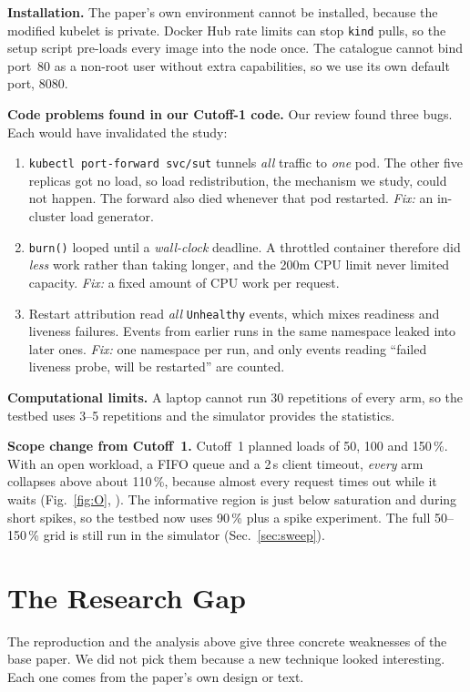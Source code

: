 \documentclass[conference]{IEEEtran}
\begin{document}
\textbf{Installation.} The paper's own environment cannot be installed,
because the modified kubelet is private. Docker Hub rate limits can stop
\texttt{kind} pulls, so the setup script pre-loads every image into the
node once. The catalogue cannot bind port~80 as a non-root user without
extra capabilities, so we use its own default port, 8080.

\textbf{Code problems found in our Cutoff-1 code.} Our review found
three bugs. Each would have invalidated the study:
\begin{enumerate}
\item \texttt{kubectl port-forward svc/sut} tunnels \emph{all} traffic
  to \emph{one} pod. The other five replicas got no load, so load
  redistribution, the mechanism we study, could not happen. The
  forward also died whenever that pod restarted. \emph{Fix:} an
  in-cluster load generator.
\item \texttt{burn()} looped until a \emph{wall-clock} deadline. A
  throttled container therefore did \emph{less} work rather than taking
  longer, and the 200m CPU limit never limited capacity. \emph{Fix:} a
  fixed amount of CPU work per request.
\item Restart attribution read \emph{all} \texttt{Unhealthy} events,
  which mixes readiness and liveness failures. Events from earlier runs
  in the same namespace leaked into later ones. \emph{Fix:} one
  namespace per run, and only events reading ``failed liveness probe,
  will be restarted'' are counted.
\end{enumerate}

\textbf{Computational limits.} A laptop cannot run 30 repetitions of
every arm, so the testbed uses 3--5 repetitions and the simulator
provides the statistics.

\textbf{Scope change from Cutoff~1.} Cutoff~1 planned loads of 50, 100
and 150\,\%. With an open workload, a FIFO queue and a 2\,s client
timeout, \emph{every} arm collapses above about 110\,\%, because almost
every request times out while it waits
(Fig.~\ref{fig:O}, \cite{beyer2016sre}). The informative region is just
below saturation and during short spikes, so the testbed now uses 90\,\%
plus a spike experiment. The full 50--150\,\% grid is still run in the
simulator (Sec.~\ref{sec:sweep}).

\section{The Research Gap}
\label{sec:gap}
The reproduction and the analysis above give three concrete weaknesses
of the base paper. We did not pick them because a new technique looked
interesting. Each one comes from the paper's own design or text.
\end{document}
